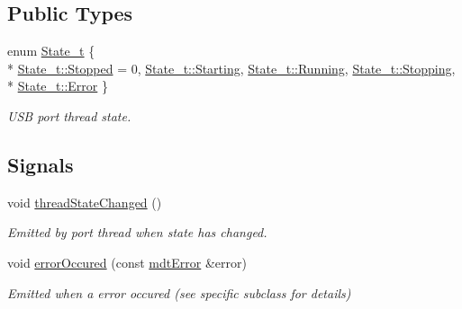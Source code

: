 \subsection*{Public Types}
\begin{DoxyCompactItemize}
\item 
enum \hyperlink{classmdt_usb_port_thread_new_acff06a201f3949a442ee854e45176de9}{State\-\_\-t} \{ \\*
\hyperlink{classmdt_usb_port_thread_new_acff06a201f3949a442ee854e45176de9ac23e2b09ebe6bf4cb5e2a9abe85c0be2}{State\-\_\-t\-::\-Stopped} = 0, 
\hyperlink{classmdt_usb_port_thread_new_acff06a201f3949a442ee854e45176de9ac2efe4bbd13e6cb0db293e72884273c0}{State\-\_\-t\-::\-Starting}, 
\hyperlink{classmdt_usb_port_thread_new_acff06a201f3949a442ee854e45176de9a5bda814c4aedb126839228f1a3d92f09}{State\-\_\-t\-::\-Running}, 
\hyperlink{classmdt_usb_port_thread_new_acff06a201f3949a442ee854e45176de9a7b7ecb39b9e110c2a31409a1672bad23}{State\-\_\-t\-::\-Stopping}, 
\\*
\hyperlink{classmdt_usb_port_thread_new_acff06a201f3949a442ee854e45176de9a902b0d55fddef6f8d651fe1035b7d4bd}{State\-\_\-t\-::\-Error}
 \}
\begin{DoxyCompactList}\small\item\em U\-S\-B port thread state. \end{DoxyCompactList}\end{DoxyCompactItemize}
\subsection*{Signals}
\begin{DoxyCompactItemize}
\item 
void \hyperlink{classmdt_usb_port_thread_new_a9d27594ed9f0fef2fae997db5939f136}{thread\-State\-Changed} ()
\begin{DoxyCompactList}\small\item\em Emitted by port thread when state has changed. \end{DoxyCompactList}\item 
void \hyperlink{classmdt_usb_port_thread_new_a9b6b49b50bb4d7eb0fc80f6c7379f720}{error\-Occured} (const \hyperlink{classmdt_error}{mdt\-Error} \&error)
\begin{DoxyCompactList}\small\item\em Emitted when a error occured (see specific subclass for details) \end{DoxyCompactList}\end{DoxyCompactItemize}

